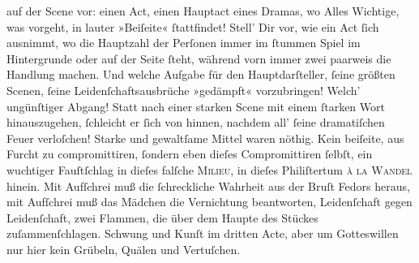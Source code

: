 \begin{ledgroupsized}[t]{13cm}
               auf der Scene vor: einen Act, einen Hauptact eines Dramas, wo Alles Wichtige, was
               vorgeht, in lauter »Beiſeite« ſtattfindet! Stell’ Dir vor, wie ein Act ſich ausnimmt,
               wo  die Haupt\strikeout{\textcolor{gray}{h}}zahl der Perſonen immer im ſtummen Spiel im Hintergrunde oder auf der Seite
               ſteht, während vorn immer zwei paarweis {\pb}die
               Handlung machen. Und welche Aufgabe für den Hauptdarſteller, ſeine größten Scenen,
               ſeine Leidenſchaftsausbrüche »gedämpft« vorzubringen! Welch’ ungünſtiger Abgang!
               Statt nach einer starken Scene mit einem ſtarken Wort hinauszugehen, ſchleicht er
               ſich von hinnen, nachdem all’ ſeine dramatiſchen Feuer verloſchen! Starke und
               gewaltſame Mittel waren nöthig. Kein beiſeite, aus Furcht zu compromittiren, ſondern
               eben dieſes Compromittiren ſelbſt, ein wuchtiger Fauſtſchlag \strikeout{\textcolor{gray}{×}\-\textcolor{gray}{×}\-\textcolor{gray}{×}} in dieſes falſche \textsc{Milieu}, in dieſes Philiſtertum \textsc{à la Wandel} hinein. Mit Aufſchrei muß die ſchreckliche Wahrheit aus der Bruſt Fedors heraus, mit Aufſchrei
               muß das Mädchen die Vernichtung beantworten, Leidenſchaft gegen Leidenſchaft, zwei
               Flammen, die über dem Haupte des Stückes zuſammenſchlagen. Schwung und Kunſt im dritten Acte, aber {\pb}um Gotteswillen nur hier kein Grübeln, Quälen und Vertuſchen.\pend

\end{ledgroupsized}
